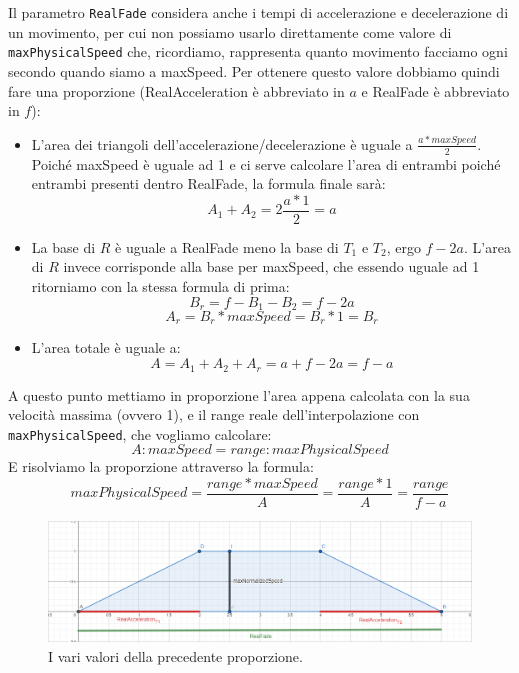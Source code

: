\documentclass[main.tex]{subfiles}
\begin{document}
Il parametro \lstinline{RealFade} considera anche i tempi di accelerazione e decelerazione di un movimento, per cui non possiamo usarlo direttamente come valore di \lstinline{maxPhysicalSpeed} che, ricordiamo, rappresenta quanto movimento facciamo ogni secondo quando siamo a maxSpeed. Per ottenere questo valore dobbiamo quindi fare una proporzione (RealAcceleration è abbreviato in $a$ e RealFade è abbreviato in $f$):
\begin{itemize}
    \item L'area dei triangoli dell'accelerazione/decelerazione è uguale a $\frac{a * maxSpeed}{2}$. Poiché maxSpeed è uguale ad 1 e ci serve calcolare l'area di entrambi poiché entrambi presenti dentro RealFade, la formula finale sarà:
    \[A_1 + A_2 = 2\frac{a * 1}{2} = a\]
    \item La base di $R$ è uguale a RealFade meno la base di $T_1$ e $T_2$, ergo $f - 2a$. L'area di $R$ invece corrisponde alla base per maxSpeed, che essendo uguale ad 1 ritorniamo con la stessa formula di prima:
    \[B_r = f - B_1 - B_2 = f - 2a\]
    \[A_r = B_r * maxSpeed = B_r * 1 = B_r\]
    \item L'area totale è uguale a:
    \[A = A_1 + A_2 + A_r = a + f - 2a = f - a\]
\end{itemize}
A questo punto mettiamo in proporzione l'area  appena calcolata con la sua velocità massima (ovvero 1), e il range reale dell'interpolazione con \lstinline{maxPhysicalSpeed}, che vogliamo calcolare:
\[A : maxSpeed = range : maxPhysicalSpeed\]
E risolviamo la proporzione attraverso la formula:
\[maxPhysicalSpeed = \frac{range * maxSpeed}{A} = \frac{range * 1}{A} = \frac{range}{f - a}\]
\begin{figure}[H]
    \centering
    \includegraphics[width=1\linewidth]{img/interpolazione/RealAccelerationVSRealFadeVSmaxSpeed.png}
    \caption{I vari valori della precedente proporzione.}
    \label{fig:4_RealAccelerationVSRealFadeVSmaxSpeed}
\end{figure}
\clearpage %
\end{document}
